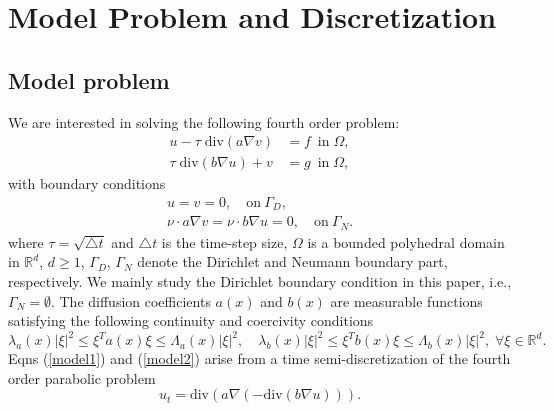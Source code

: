\documentclass[smallcondensed]{svjour3}
\numberwithin{equation}{section} \numberwithin{table}{section}
\numberwithin{figure}{section}
\numberwithin{algorithm}{section}
\begin{document}
\section{Model Problem and Discretization}
\subsection{Model problem}
We are interested in solving the following fourth order problem: 
\begin{align}\label{model1}
u-\tau\;\mbox{div}(a\nabla v)&=f \ \;\mbox{in}\;\Omega,\\ \label{model2}
\tau\;\mbox{div}(b\nabla u)+v&=g \ \;\mbox{in}\;\Omega,
\end{align}
with boundary conditions
\begin{align}
\label{bd1}
u=v=0,\quad \mbox{on} \   \Gamma_D, \\
\label{bd2}
\nu\cdot a\nabla v=\nu\cdot b\nabla u=0,\quad\mbox{on} \  \Gamma_N.
\end{align}
where $\tau = \sqrt{\triangle t}$ and $\triangle t$ is the time-step size, $\Omega$ is a bounded polyhedral domain in $\mathbb{R}^d$, $d\geq 1$, $\Gamma_D$, $\Gamma_N$ denote the Dirichlet and Neumann boundary part, respectively. We mainly study the Dirichlet boundary condition in this paper, i.e., $\Gamma_N=\emptyset$. The diffusion coefficients $a(x)$ and $b(x)$ are measurable functions satisfying the following continuity and coercivity conditions
$$
\lambda_{a}(x)|\xi|^2\leq\xi^{T}a(x)\xi\leq\Lambda_{a}(x)|\xi|^2,\quad \lambda_{b}(x)|\xi|^2\leq\xi^{T}b(x)\xi\leq\Lambda_{b}(x)|\xi|^2,\; \forall\xi\in\mathbb{R}^{d}.
$$ 
Eqns (\ref{model1}) and (\ref{model2}) arise from a time semi-discretization of the fourth order parabolic problem
$$
u_t=\mbox{div}(a\nabla(-\mbox{div}(b\nabla u))).
$$
\end{document}
